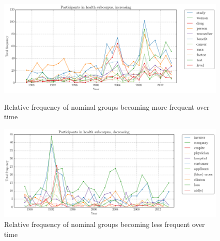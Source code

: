 \begin{figure}[htb!]
\centering
\begin{minipage}{.42\textwidth}
\centering
\includegraphics[width=1\textwidth]{../images/3.png}
\caption{Relative frequency of nominal groups becoming more frequent over time}
\label{fig:3}
\end{minipage}%
\begin{minipage}{.42\textwidth}
\centering
\includegraphics[width=1\textwidth]{../images/4.png}
\caption{Relative frequency of nominal groups becoming less frequent over time}
\label{fig:4}
\end{minipage}
\end{figure}


